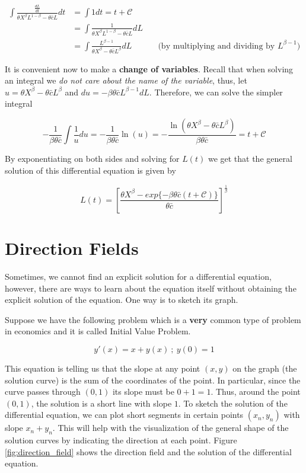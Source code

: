 \documentclass[a4paper,11pt]{article}
\theoremstyle{definition}
\theoremstyle{plain}
\begin{document}
\begin{align*}
\int \frac{\frac{dL}{dt}}{\theta X^{\beta}L^{1-\beta} - \theta\bar{c}L} dt &= \int 1 dt = t+\mathcal{C} & \ & \\
&= \int \frac{1}{\theta X^{\beta}L^{1-\beta} - \theta\bar{c}L} dL & \ & \\
&= \int \frac{L^{\beta-1}}{\theta X^{\beta} - \theta\bar{c}L^{\beta}} dL & \ & \text{(by multiplying and dividing by $L^{\beta-1}$)}
\end{align*}

It is convenient now to make a \textbf{change of variables}. Recall that when solving an integral we \emph{do not care about the name of the variable}, thus, let \(u = \theta X^{\beta} - \theta\bar{c}L^{\beta}\) and \(du = -\beta\theta\bar{c}L^{\beta-1}dL\). Therefore, we can solve the simpler integral

\[
-\frac{1}{\beta\theta\bar{c}}\int\frac{1}{u} du = -\frac{1}{\beta\theta\bar{c}}\ln(u) = -\frac{\ln\left(\theta X^{\beta} -\theta\bar{c}L^{\beta}\right)}{\beta\theta\bar{c}} = t+\mathcal{C}
\]

By exponentiating on both sides and solving for \(L(t)\) we get that the general solution of this differential equation is given by

\[
L(t) = \left[\frac{\theta X^{\beta} - exp\{-\beta\theta\bar{c}(t+\mathcal{C})\}}{\theta\bar{c}}\right]^{\frac{1}{\beta}}
\]


\section{Direction Fields}\label{direction-fields}

Sometimes, we cannot find an explicit solution for a differential equation, however, there are ways to learn about the equation itself without obtaining the explicit solution of the equation. One way is to sketch its graph.

Suppose we have the following problem which is a \textbf{very} common type of problem in economics and it is called Initial Value Problem.

\[
y'(x) = x + y(x) \ ; \ y(0) = 1
\]

This equation is telling us that the slope at any point \((x,y)\) on the graph (the solution curve) is the sum of the coordinates of the point. In particular, since the curve passes through \((0,1)\) its slope must be \(0 + 1 = 1\). Thus, around the point \((0,1)\), the solution is a short line with slope \(1\). To sketch the solution of the differential equation, we can plot short segments in certain points \((x_n,y_n)\) with slope \(x_n + y_n\). This will help with the visualization of the general shape of the solution curves by indicating the direction at each point. Figure \ref{fig:direction_field} shows the direction field and the solution of the differential equation.
	
\end{document}
